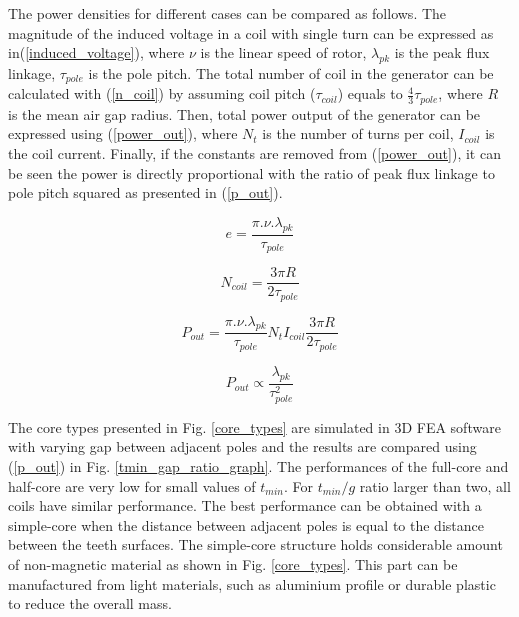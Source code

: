 \documentclass[final,peerreview,onecolumn]{IEEEtran}
\begin{document}
The power densities for different cases can be compared as follows. The magnitude of the induced voltage in a coil with single turn can be expressed as in(\ref{induced_voltage}), where $\nu$ is the linear speed of rotor, $\lambda_{pk}$ is the peak flux linkage, $\tau_{pole}$ is the pole pitch. The total number of coil in the generator can be calculated with (\ref{n_coil}) by assuming coil pitch ($\tau_{coil}$) equals to $\frac{4}{3}\tau_{pole}$, where $R$ is the mean air gap radius. Then, total power output of the generator can be expressed using (\ref{power_out}), where $N_{t}$ is the number of turns per coil, $I_{coil}$ is the coil current. Finally, if the constants are removed from (\ref{power_out}), it can be seen the power is directly proportional with the ratio of peak flux linkage to pole pitch squared as presented in (\ref{p_out}).

\begin{equation}
    e=\dfrac{\pi.\nu.\lambda_{pk}}{\tau_{pole}}
    \label{induced_voltage}
\end{equation}

\begin{equation}
    N_{coil}=\dfrac{3\pi R}{2\tau_{pole}}
    \label{n_coil}
\end{equation}

\begin{equation}
    P_{out}=\dfrac{\pi.\nu.\lambda_{pk}}{\tau_{pole}}N_{t}I_{coil}\dfrac{3\pi R}{2\tau_{pole}}
	\label{power_out}
\end{equation}

\begin{equation}
    P_{out} \propto \dfrac{\lambda_{pk}}{\tau_{pole}^{2}}
    \label{p_out}
\end{equation}

The core types presented in Fig. \ref{core_types} are simulated in 3D FEA software with varying gap between adjacent poles and the results are compared using (\ref{p_out}) in Fig. \ref{tmin_gap_ratio_graph}. The performances of the full-core and half-core are very low for small values of $t_{min}$. For $t_{min}/g$ ratio larger than two, all coils have similar performance. The best performance can be obtained with a simple-core when the distance between adjacent poles is equal to the distance between the teeth surfaces. The simple-core structure holds considerable amount of non-magnetic material as shown in Fig. \ref{core_types}. This part can be manufactured from light materials, such as aluminium profile or durable plastic to reduce the overall mass. 
\end{document}
